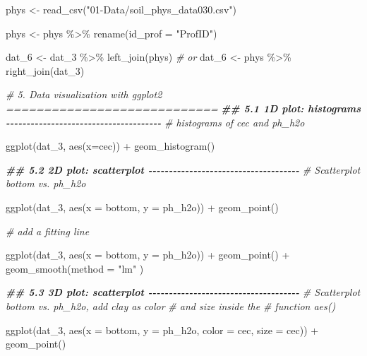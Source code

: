 \documentclass[
  10pt,
  b5paper,
  oneside]{book}
\newenvironment{Shaded}{\begin{snugshade}}{\end{snugshade}}
\newcommand{\AttributeTok}[1]{\textcolor[rgb]{0.77,0.63,0.00}{#1}}
\newcommand{\CommentTok}[1]{\textcolor[rgb]{0.56,0.35,0.01}{\textit{#1}}}
\newcommand{\DocumentationTok}[1]{\textcolor[rgb]{0.56,0.35,0.01}{\textbf{\textit{#1}}}}
\newcommand{\FunctionTok}[1]{\textcolor[rgb]{0.00,0.00,0.00}{#1}}
\newcommand{\NormalTok}[1]{#1}
\newcommand{\OtherTok}[1]{\textcolor[rgb]{0.56,0.35,0.01}{#1}}
\newcommand{\SpecialCharTok}[1]{\textcolor[rgb]{0.00,0.00,0.00}{#1}}
\newcommand{\StringTok}[1]{\textcolor[rgb]{0.31,0.60,0.02}{#1}}
\begin{document}
\begin{Shaded}
\begin{Highlighting}[]
\NormalTok{phys }\OtherTok{\textless{}{-}} \FunctionTok{read\_csv}\NormalTok{(}\StringTok{"01{-}Data/soil\_phys\_data030.csv"}\NormalTok{)}

\NormalTok{phys }\OtherTok{\textless{}{-}}\NormalTok{ phys }\SpecialCharTok{\%\textgreater{}\%} \FunctionTok{rename}\NormalTok{(}\AttributeTok{id\_prof =} \StringTok{"ProfID"}\NormalTok{)}

\NormalTok{dat\_6 }\OtherTok{\textless{}{-}}\NormalTok{ dat\_3 }\SpecialCharTok{\%\textgreater{}\%} 
  \FunctionTok{left\_join}\NormalTok{(phys)}
\CommentTok{\# or}
\NormalTok{dat\_6 }\OtherTok{\textless{}{-}}\NormalTok{ phys }\SpecialCharTok{\%\textgreater{}\%} 
  \FunctionTok{right\_join}\NormalTok{(dat\_3)}

\CommentTok{\# 5. Data visualization with ggplot2 ============================}
\DocumentationTok{\#\# 5.1 1D plot: histograms {-}{-}{-}{-}{-}{-}{-}{-}{-}{-}{-}{-}{-}{-}{-}{-}{-}{-}{-}{-}{-}{-}{-}{-}{-}{-}{-}{-}{-}{-}{-}{-}{-}{-}{-}{-}{-}{-}}
\CommentTok{\# histograms of cec and ph\_h2o}

\FunctionTok{ggplot}\NormalTok{(dat\_3, }\FunctionTok{aes}\NormalTok{(}\AttributeTok{x=}\NormalTok{cec)) }\SpecialCharTok{+} \FunctionTok{geom\_histogram}\NormalTok{()}

\DocumentationTok{\#\# 5.2 2D plot: scatterplot {-}{-}{-}{-}{-}{-}{-}{-}{-}{-}{-}{-}{-}{-}{-}{-}{-}{-}{-}{-}{-}{-}{-}{-}{-}{-}{-}{-}{-}{-}{-}{-}{-}{-}{-}{-}{-}}
\CommentTok{\# Scatterplot bottom vs. ph\_h2o}

\FunctionTok{ggplot}\NormalTok{(dat\_3, }\FunctionTok{aes}\NormalTok{(}\AttributeTok{x =}\NormalTok{ bottom, }\AttributeTok{y =}\NormalTok{ ph\_h2o)) }\SpecialCharTok{+} 
  \FunctionTok{geom\_point}\NormalTok{() }

\CommentTok{\# add a fitting line}

\FunctionTok{ggplot}\NormalTok{(dat\_3, }\FunctionTok{aes}\NormalTok{(}\AttributeTok{x =}\NormalTok{ bottom, }\AttributeTok{y =}\NormalTok{ ph\_h2o)) }\SpecialCharTok{+} 
  \FunctionTok{geom\_point}\NormalTok{() }\SpecialCharTok{+}
  \FunctionTok{geom\_smooth}\NormalTok{(}\AttributeTok{method =} \StringTok{"lm"}\NormalTok{ )}

\DocumentationTok{\#\# 5.3 3D plot: scatterplot {-}{-}{-}{-}{-}{-}{-}{-}{-}{-}{-}{-}{-}{-}{-}{-}{-}{-}{-}{-}{-}{-}{-}{-}{-}{-}{-}{-}{-}{-}{-}{-}{-}{-}{-}{-}{-}}
\CommentTok{\# Scatterplot bottom vs. ph\_h2o, add clay as color }
\CommentTok{\# and size inside the }
\CommentTok{\# function aes()}

\FunctionTok{ggplot}\NormalTok{(dat\_3, }
       \FunctionTok{aes}\NormalTok{(}\AttributeTok{x =}\NormalTok{ bottom, }\AttributeTok{y =}\NormalTok{ ph\_h2o, }\AttributeTok{color =}\NormalTok{ cec, }\AttributeTok{size =}\NormalTok{ cec)) }\SpecialCharTok{+} 
  \FunctionTok{geom\_point}\NormalTok{()}


\end{Highlighting}
\end{Shaded}
\end{document}
